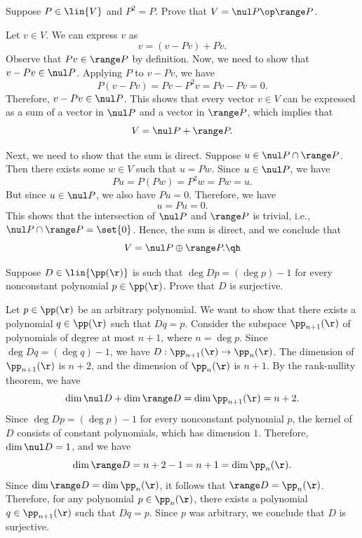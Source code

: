 \begin{exercise}[3b27]
    Suppose $P \in \lin{V}$ and $P^2 = P$. Prove that $V = \nul P \op \range P$.
\end{exercise}

\begin{sol}
    Let $v \in V$. We can express $v$ as
    \[v = (v - Pv) + Pv.\]
    Observe that $Pv \in \range P$ by definition. Now, we need to show that $v - Pv \in \nul P$. Applying $P$ to $v - Pv$, we have
    \[P(v - Pv) = Pv - P^2v = Pv - Pv = 0.\]
    Therefore, $v - Pv \in \nul P$. This shows that every vector $v \in V$ can be expressed as a sum of a vector in $\nul P$ and a vector in $\range P$, which implies that
    \[V = \nul P + \range P.\]

    Next, we need to show that the sum is direct. Suppose $u \in \nul P \cap \range P$. Then there exists some $w \in V$ such that $u = Pw$. Since $u \in \nul P$, we have
    \[Pu = P(Pw) = P^2w = Pw = u.\]
    But since $u \in \nul P$, we also have $Pu = 0$. Therefore, we have
    \[u = Pu = 0.\]
    This shows that the intersection of $\nul P$ and $\range P$ is trivial, i.e., $\nul P \cap \range P = \set{0}$. Hence, the sum is direct, and we conclude that
    \[V = \nul P \oplus \range P. \qh\]
\end{sol}

\begin{exercise}[3b28]
    Suppose $D \in \lin{\pp(\r)}$ is such that $\deg Dp = (\deg p) - 1$ for every nonconstant polynomial $p \in \pp(\r)$. Prove that $D$ is surjective.
    
\end{exercise}

\begin{sol}
    Let $p \in \pp(\r)$ be an arbitrary polynomial. We want to show that there exists a polynomial $q \in \pp(\r)$ such that $Dq = p$. Consider the subspace $\pp_{n + 1}(\r)$ of polynomials of degree at most $n + 1$, where $n = \deg p$. Since $\deg Dq = (\deg q) - 1$, we have $D: \pp_{n + 1}(\r) \to \pp_n(\r)$. The dimension of $\pp_{n + 1}(\r)$ is $n + 2$, and the dimension of $\pp_n(\r)$ is $n + 1$. By the rank-nullity theorem, we have
    \[\dim \nul D + \dim \range D = \dim \pp_{n + 1}(\r) = n + 2.\]
    Since $\deg Dp = (\deg p) - 1$ for every nonconstant polynomial $p$, the kernel of $D$ consists of constant polynomials, which has dimension $1$. Therefore, $\dim \nul D = 1$, and we have
    \[\dim \range D = n + 2 - 1 = n + 1 = \dim \pp_n(\r).\]
    Since $\dim \range D = \dim \pp_n(\r)$, it follows that $\range D = \pp_n(\r)$. Therefore, for any polynomial $p \in \pp_n(\r)$, there exists a polynomial $q \in \pp_{n + 1}(\r)$ such that $Dq = p$. Since $p$ was arbitrary, we conclude that $D$ is surjective.
\end{sol}

